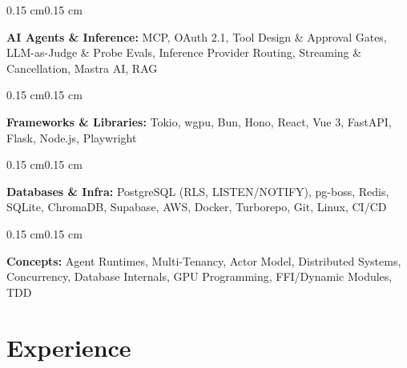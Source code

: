 \documentclass[10pt, letterpaper]{article}
\newenvironment{onecolentry}{
    \begin{adjustwidth}{0.15 cm}{0.15 cm}
}{
    \end{adjustwidth}
}
\begin{document}
        \vspace{0.07 cm}

        \begin{onecolentry}
            \textbf{AI Agents \& Inference:} MCP, OAuth 2.1, Tool Design \& Approval Gates, LLM-as-Judge \& Probe Evals, Inference Provider Routing, Streaming \& Cancellation, Mastra AI, RAG
        \end{onecolentry}

        \vspace{0.07 cm}

        \begin{onecolentry}
            \textbf{Frameworks \& Libraries:} Tokio, wgpu, Bun, Hono, React, Vue 3, FastAPI, Flask, Node.js, Playwright
        \end{onecolentry}

        \vspace{0.07 cm}

        \begin{onecolentry}
            \textbf{Databases \& Infra:} PostgreSQL (RLS, LISTEN/NOTIFY), pg-boss, Redis, SQLite, ChromaDB, Supabase, AWS, Docker, Turborepo, Git, Linux, CI/CD
        \end{onecolentry}

        \vspace{0.07 cm}

        \begin{onecolentry}
            \textbf{Concepts:} Agent Runtimes, Multi-Tenancy, Actor Model, Distributed Systems, Concurrency, Database Internals, GPU Programming, FFI/Dynamic Modules, TDD
        \end{onecolentry}

    \section{Experience}
\end{document}
